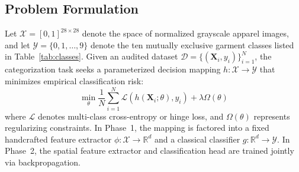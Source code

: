 \documentclass[conference]{IEEEtran}
\newcommand{\R}{\mathbb{R}}
\begin{document}
\subsection{Problem Formulation}
Let $\mathcal{X} = [0, 1]^{28 \times 28}$ denote the space of normalized grayscale apparel images, and let $\mathcal{Y} = \{0, 1, \dots, 9\}$ denote the ten mutually exclusive garment classes listed in Table~\ref{tab:classes}. Given an audited dataset $\mathcal{D} = \{(\mathbf{X}_i, y_i)\}_{i=1}^N$, the categorization task seeks a parameterized decision mapping $h: \mathcal{X} \to \mathcal{Y}$ that minimizes empirical classification risk:
\begin{equation}
\min_{\theta} \frac{1}{N} \sum_{i=1}^N \mathcal{L}(h(\mathbf{X}_i; \theta), y_i) + \lambda \Omega(\theta)
\end{equation}
where $\mathcal{L}$ denotes multi-class cross-entropy or hinge loss, and $\Omega(\theta)$ represents regularizing constraints. In Phase~1, the mapping is factored into a fixed handcrafted feature extractor $\phi: \mathcal{X} \to \R^d$ and a classical classifier $g: \R^d \to \mathcal{Y}$. In Phase~2, the spatial feature extractor and classification head are trained jointly via backpropagation.

\begin{table}[t]
\centering
\caption{Fashion-MNIST Taxonomy and Category Indexing}
\label{tab:classes}
\end{table}
\end{document}
